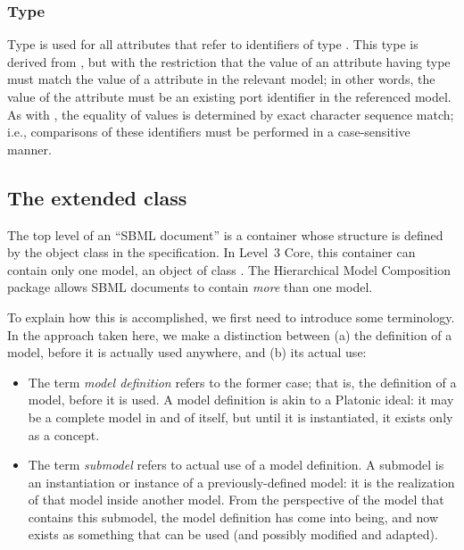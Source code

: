 \subsubsection{Type \fixttspace{}}
\label{primtype-portidref}

Type  is used for all attributes that refer to
identifiers of type .  This type is derived from
, but with the restriction that the value of an
attribute having type  must match the value of a
 attribute in the relevant model;  in other words, the value of
the attribute must be an existing port identifier in
the referenced model.  As with , the equality of
 values is determined by exact character sequence
match; i.e., comparisons of these identifiers must be performed in a
case-sensitive manner.


\subsection{The extended  class}
\label{sbml-class}
\label{listofmodeldefinitions-class}
\label{listofexternalmodeldefinitions-class}

The top level of an ``SBML document'' is a container whose structure is
defined by the object class \SBML in the \sbmlthreecore specification.  In
Level~3 Core, this container can contain only one model, an object of
class \Model.  The Hierarchical Model Composition package allows SBML
documents to contain \emph{more} than one model.

To explain how this is accomplished, we first need to introduce some
terminology.  In the approach taken here, we make a distinction between
(a) the definition of a model, before it is actually used anywhere, and
(b) its actual use:

\begin{itemize}

\item The term \emph{model definition} refers to the former case; that
  is, the definition of a model, before it is used.  A model definition
  is akin to a Platonic ideal: it may be a complete model in and of
  itself, but until it is instantiated, it exists only as a concept.

\item The term \emph{submodel} refers to actual use of a model
  definition.  A submodel is an instantiation or instance of a
  previously-defined model: it is the realization of that model inside
  another model.  From the perspective of the model that contains this
  submodel, the model definition has come into being, and now exists as
  something that can be used (and possibly modified and adapted).

\end{itemize}

